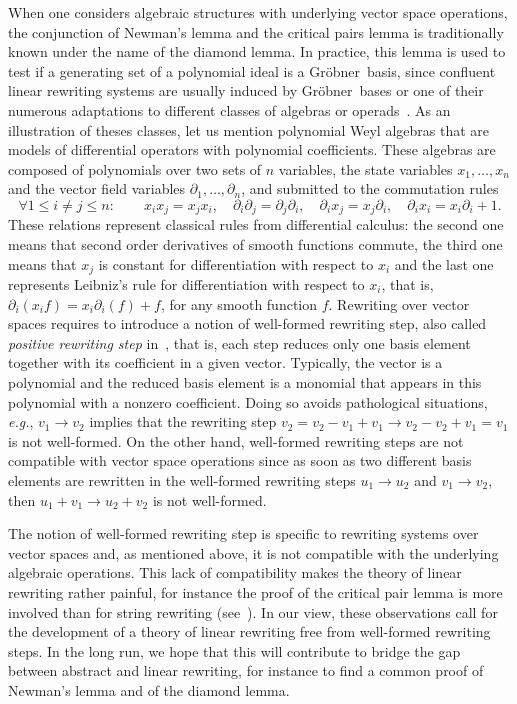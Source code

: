 \documentclass[11pt]{article}
\theoremstyle{definition}
\newcommand\eg{\emph{e.g.}}
\newcommand\G{Gröbner}
\begin{document}
When one considers algebraic structures with underlying vector space
operations, the conjunction of Newman's lemma and the critical pairs
lemma is traditionally known under the name of the diamond lemma. In
practice, this lemma is used to test if a generating set of a polynomial
ideal is a \G\ basis, since confluent linear rewriting systems are
usually induced by \G\ bases or one of their numerous adaptations to
different classes of algebras or operads~\cite{MR506890, MR2202562,
  MR2667136, MR1044911, MR1299371}. As an illustration of theses classes,
let us mention polynomial Weyl algebras that are models of differential
operators with polynomial coefficients. These algebras are composed of
polynomials over two sets of $n$ variables, the state variables
$x_1,\ldots,x_n$ and the vector field variables
$\partial_1,\ldots,\partial_n$, and submitted to the commutation rules
\[ \forall 1\leq i\neq j\leq n: \qquad x_ix_j=x_jx_i,
\quad \partial_i\partial_j=\partial_j\partial_i, \quad \partial_ix_j=
x_j\partial_i, \quad\partial_ix_i=x_i\partial_i+1. \]
These relations represent classical rules from differential calculus: the
second one means that second order derivatives of smooth functions
commute, the third one means that $x_j$ is constant for differentiation
with respect to $x_i$ and the last one represents Leibniz's rule for
differentiation with respect to $x_i$, that is,
$\partial_i(x_if)=x_i\partial_i(f)+f$, for any smooth function $f$.
Rewriting over vector spaces requires to introduce a notion of
well-formed rewriting step, also called {\em positive rewriting step}
in~\cite{GuiraudHoffbeckMalbos19}, that is, each step reduces only one
basis element together with its coefficient in a given vector. Typically,
the vector is a polynomial and the reduced basis element is a monomial
that appears in this polynomial with a nonzero coefficient. Doing so
avoids pathological situations, \eg, $v_1\to v_2$ implies that the
rewriting step $v_2=v_2-v_1+v_1\to v_2-v_2+v_1=v_1$ is not well-formed.
On the other hand, well-formed rewriting steps are not compatible with
vector space operations since as soon as two different basis elements are
rewritten in the well-formed rewriting steps $u_1\to u_2$ and
$v_1\to v_2$, then $u_1+v_1\to u_2+v_2$ is not well-formed.
\medskip

The notion of well-formed rewriting step is specific to rewriting systems over
vector spaces and, as mentioned above, it is not compatible with the underlying
algebraic operations. This lack of compatibility makes the theory of linear
rewriting rather painful, for instance the proof of the critical pair lemma is
more involved than for string rewriting (see~\cite[Theorem
4.2.1]{GuiraudHoffbeckMalbos19}). In our view, these observations call for the
development of a theory of linear rewriting free from well-formed rewriting
steps. In the long run, we hope that this will contribute to bridge the gap
between abstract and linear rewriting, for instance to find a common proof of
Newman's lemma and of the diamond lemma.
\end{document}
